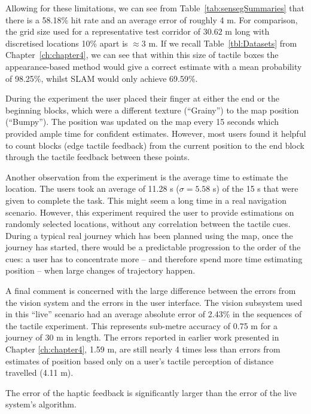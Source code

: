 Allowing for these limitations, we can see from Table~\ref{tab:sensegSummaries} that there is a 58.18\% hit rate and an average error of roughly 4 m. For comparison, the grid size used for a representative test corridor of $30.62$ m long with discretised locations 10\% apart is $\approx 3$ m. If we recall Table~\ref{tbl:Datasets} from Chapter~\ref{ch:chapter4}, we can see that within this size of tactile boxes the appearance-based method would give a correct estimate with a mean probability of 98.25\%, whilst SLAM would only achieve 69.59\%.

During the experiment the user placed their finger at either the end or the beginning blocks, which were a different texture (``Grainy'') to the map position (``Bumpy''). The position was updated on the map every 15 seconds which provided ample time for confident estimates. However, most users found it helpful to count blocks (edge tactile feedback) from the current position to the end block through the tactile feedback between these points.

Another observation from the experiment is the average time to estimate the location. The users took an average of 11.28 s ($\sigma = 5.58$ s) of the 15 s that were given to complete the task. This might seem a long time in a real navigation scenario. However, this experiment required the user to provide estimations on randomly selected locations, without any correlation between the tactile cues. During a typical real journey which has been planned using the map, once the journey has started, there would be a predictable progression to the order of the cues: a user has to concentrate more -- and therefore spend more time estimating position -- when large changes of trajectory happen.

A final comment is concerned with the large difference between the errors from the vision system and the errors in the user interface. The vision subsystem used in this ``live'' scenario had an average absolute error of 2.43\% in the sequences of the tactile experiment. This represents sub-metre accuracy of 0.75 m for a journey of 30 m in length. The errors reported in earlier work presented in Chapter \ref{ch:chapter4}, 1.59 m, are still nearly 4 times less than errors from estimates of position based only on a user's tactile perception of distance travelled (4.11 m).

The error of the haptic feedback is significantly larger than the error of the live system's algorithm.


